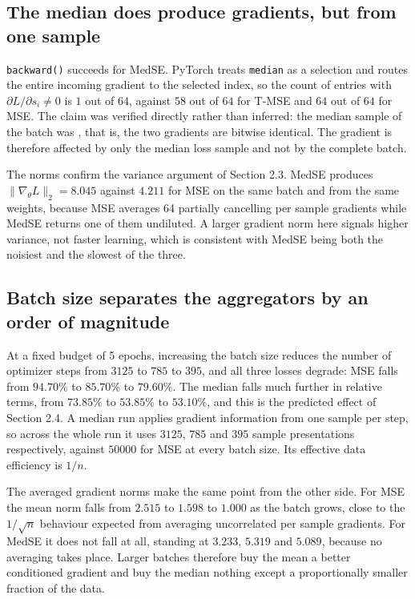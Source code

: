 \documentclass[12pt]{article}
\begin{document}
\subsection{The median does produce gradients, but from one sample}

\texttt{backward()} succeeds for MedSE. PyTorch treats \texttt{median} as a selection and routes the entire incoming gradient to the selected index, so the count of entries with $\partial L/\partial s_i \neq 0$ is $1$ out of $64$, against $58$ out of $64$ for T-MSE and $64$ out of $64$ for MSE. The claim was verified directly rather than inferred: the median sample of the batch was \unskip, that is, the two gradients are bitwise identical. The gradient is therefore affected by only the median loss sample and not by the complete batch.

The norms confirm the variance argument of Section 2.3. MedSE produces $\|\nabla_\theta L\|_2 = 8.045$ against $4.211$ for MSE on the same batch and from the same weights, because MSE averages 64 partially cancelling per sample gradients while MedSE returns one of them undiluted. A larger gradient norm here signals higher variance, not faster learning, which is consistent with MedSE being both the noisiest and the slowest of the three.

\subsection{Batch size separates the aggregators by an order of magnitude}

At a fixed budget of 5 epochs, increasing the batch size reduces the number of optimizer steps from $3125$ to $785$ to $395$, and all three losses degrade: MSE falls from $94.70\%$ to $85.70\%$ to $79.60\%$. The median falls much further in relative terms, from $73.85\%$ to $53.85\%$ to $53.10\%$, and this is the predicted effect of Section 2.4. A median run applies gradient information from one sample per step, so across the whole run it uses $3125$, $785$ and $395$ sample presentations respectively, against $50000$ for MSE at every batch size. Its effective data efficiency is $1/n$.

The averaged gradient norms make the same point from the other side. For MSE the mean norm falls from $2.515$ to $1.598$ to $1.000$ as the batch grows, close to the $1/\sqrt{n}$ behaviour expected from averaging uncorrelated per sample gradients. For MedSE it does not fall at all, standing at $3.233$, $5.319$ and $5.089$, because no averaging takes place. Larger batches therefore buy the mean a better conditioned gradient and buy the median nothing except a proportionally smaller fraction of the data.
\end{document}

